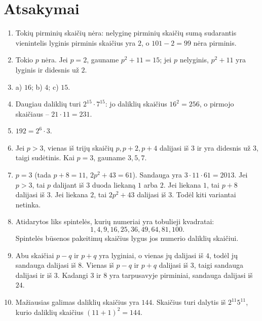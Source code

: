 \documentclass[11pt,a4paper]{scrartcl}
\begin{document}
\newpage
\section{Atsakymai}

\begin{enumerate}
    \renewcommand{\labelenumi}{\textbf{\theenumi.}}
    \item Tokių pirminių skaičių nėra: nelyginę pirminių skaičių sumą sudarantis vienintelis lyginis pirminis skaičius yra $2$, o \(101-2=99\) nėra pirminis.
    \item Tokio \(p\) nėra. Jei \(p=2\), gauname \(p^2+11=15\); jei \(p\) nelyginis, \(p^2+11\) yra lyginis ir didesnis už $2$.
    \item a) $16$; b) $4$; c) $15$.
    \item Daugiau daliklių turi \(2^{15}\cdot7^{15}\): jo daliklių skaičius \(16^2=256\), o pirmojo skaičiaus – \(21\cdot11=231\).
    \item \(192=2^6\cdot3\).
    \item Jei \(p>3\), vienas iš trijų skaičių \(p,p+2,p+4\) dalijasi iš $3$ ir yra didesnis už $3$, taigi sudėtinis. Kai \(p=3\), gauname $3,5,7$.
    \item \(p=3\) (tada \(p+8=11\), \(2p^2+43=61\)). Sandauga yra \(3 \cdot 11 \cdot 61 = 2013\). Jei \(p > 3\), tai \(p\) dalijant iš $3$ duoda liekaną $1$ arba $2$. Jei liekana $1$, tai \(p+8\) dalijasi iš $3$. Jei liekana $2$, tai \(2p^2+43\) dalijasi iš $3$. Todėl kiti variantai netinka.
    \item Atidarytos liks spintelės, kurių numeriai yra tobulieji kvadratai:
    \begin{equation*}
        1,4,9,16,25,36,49,64,81,100.
    \end{equation*}
    Spintelės būsenos pakeitimų skaičius lygus jos numerio daliklių skaičiui.
    \item Abu skaičiai \(p-q\) ir \(p+q\) yra lyginiai, o vienas jų dalijasi iš $4$, todėl jų sandauga dalijasi iš $8$. Vienas iš \(p-q\) ir \(p+q\) dalijasi iš $3$, taigi sandauga dalijasi ir iš $3$. Kadangi $3$ ir $8$ yra tarpusavyje pirminiai, sandauga dalijasi iš $24$.
    \item Mažiausias galimas daliklių skaičius yra $144$. Skaičius turi dalytis iš \(2^{11}5^{11}\), kurio daliklių skaičius \((11+1)^2=144\).
\end{enumerate}
\end{document}
